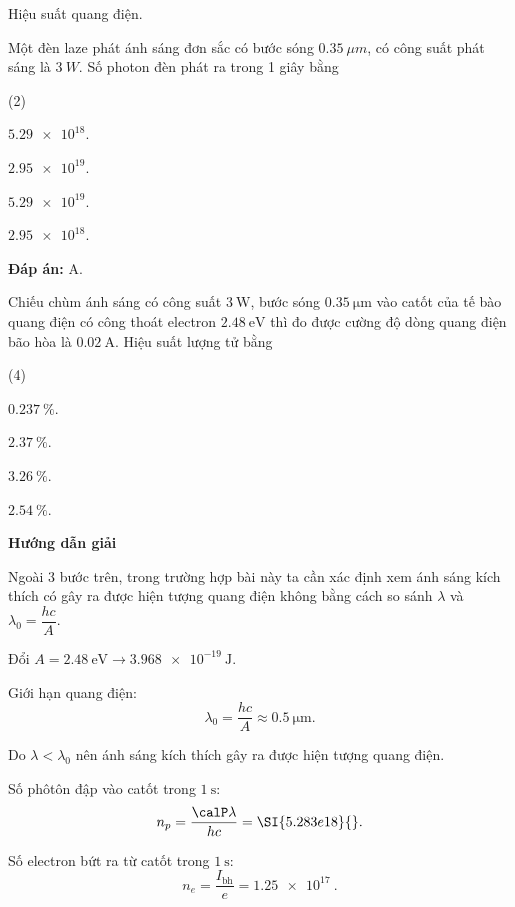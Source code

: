 \begin{dang}{Hiệu suất quang điện.}
{		Một đèn laze phát ánh sáng đơn sắc có bước sóng $ \SI{0,35}{\mu m} $, có công suất phát sáng là $ \SI{3}{W} $. Số photon đèn phát ra trong 1 giây bằng
		\begin{mcq}(2)
			\item $ \num{5,29 e18} $. 
			\item $ \num{2,95 e19} $.
			\item $ \num{5,29 e19} $. 
			\item $ \num{2,95 e18} $. 
		\end{mcq}
		\textbf{Đáp án:} A.
	}
	
	
	{
		Chiếu chùm ánh sáng có công suất $\SI{3}{\watt}$, bước sóng $\SI{0.35}{\micro \meter}$ vào catốt của tế bào quang điện có công thoát electron $\SI{2.48}{\electronvolt}$ thì đo được cường độ dòng quang điện bão hòa là $\SI{0.02}{\ampere}$. Hiệu suất lượng tử bằng
		\begin{mcq}(4)
			\item $\SI{0.237}{\percent}$.
			\item $\SI{2.37}{\percent}$.
			\item $\SI{3.26}{\percent}$.
			\item $\SI{2.54}{\percent}$.
	\end{mcq}}
	{\begin{center}
			\textbf{Hướng dẫn giải}
		\end{center}
		
		Ngoài 3 bước trên, trong trường hợp bài này ta cần xác định xem ánh sáng kích thích có gây ra được hiện tượng quang điện không bằng cách so sánh $\lambda$ và $\lambda_0=\dfrac{hc}{A}$.
		
		Đổi $A=\SI{2.48}{\electronvolt} \rightarrow \SI{3.968e-19}{\joule}$.
		
		Giới hạn quang điện:
		\begin{equation*}
			\lambda_0 = \dfrac{hc}{A} \approx \SI{0.5}{\micro \meter}.
		\end{equation*}
		
		Do $\lambda < \lambda_0$ nên ánh sáng kích thích gây ra được hiện tượng quang điện.
		
		Số phôtôn đập vào catốt trong $\SI{1}{\second}$:
		\begin{equation*}
			n_p=\dfrac{\calP \lambda}{hc}=\SI{5.283e18}{}.
		\end{equation*}
		
		Số electron bứt ra từ catốt trong $\SI{1}{\second}$:
		\begin{equation*}
			n_e=\dfrac{I_\text{bh}}{e}=\SI{1.25e17}{}.
		\end{equation*}
		
}
\end{dang}
